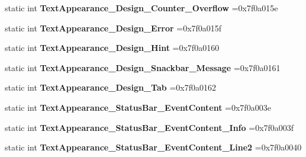 \begin{DoxyCompactItemize}
static int {\bfseries Text\+Appearance\+\_\+\+Design\+\_\+\+Counter\+\_\+\+Overflow} =0x7f0a015e
\item 
\mbox{\label{classandroid_1_1support_1_1design_1_1R_1_1style_a1f7b723de7a7d4ca72997a997cd51142}} 
static int {\bfseries Text\+Appearance\+\_\+\+Design\+\_\+\+Error} =0x7f0a015f
\item 
\mbox{\label{classandroid_1_1support_1_1design_1_1R_1_1style_a8696257a77175d1607146fdf8d93d3c0}} 
static int {\bfseries Text\+Appearance\+\_\+\+Design\+\_\+\+Hint} =0x7f0a0160
\item 
\mbox{\label{classandroid_1_1support_1_1design_1_1R_1_1style_a76abb1cac4a3f51027986adb5fde7556}} 
static int {\bfseries Text\+Appearance\+\_\+\+Design\+\_\+\+Snackbar\+\_\+\+Message} =0x7f0a0161
\item 
\mbox{\label{classandroid_1_1support_1_1design_1_1R_1_1style_ac8087551e0a2d70baed5e89280a32d85}} 
static int {\bfseries Text\+Appearance\+\_\+\+Design\+\_\+\+Tab} =0x7f0a0162
\item 
\mbox{\label{classandroid_1_1support_1_1design_1_1R_1_1style_a7efd6e7630d3e6123daca29e3f7538eb}} 
static int {\bfseries Text\+Appearance\+\_\+\+Status\+Bar\+\_\+\+Event\+Content} =0x7f0a003e
\item 
\mbox{\label{classandroid_1_1support_1_1design_1_1R_1_1style_a1091a3026a08c6512e783f18f640c9d6}} 
static int {\bfseries Text\+Appearance\+\_\+\+Status\+Bar\+\_\+\+Event\+Content\+\_\+\+Info} =0x7f0a003f
\item 
\mbox{\label{classandroid_1_1support_1_1design_1_1R_1_1style_a1090f05c80690de79aa0d98bb948464b}} 
static int {\bfseries Text\+Appearance\+\_\+\+Status\+Bar\+\_\+\+Event\+Content\+\_\+\+Line2} =0x7f0a0040
\item 
\mbox{\label{classandroid_1_1support_1_1design_1_1R_1_1style_aaa23e5611b17d0bf6f145a55015bbbb1}} 

\end{DoxyCompactItemize}
